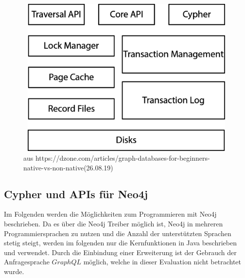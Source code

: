 \begin{figure}[H]
	\centering
	\includegraphics [width=12cm, height=8cm]{Figures/architecture}
	\caption[Architekur von Neo4j]{ aus https://dzone.com/articles/graph-databases-for-beginners-native-vs-non-native(26.08.19)}
	\label{fig:Architecure}
\end{figure}

\subsection{Cypher und APIs für Neo4j}
Im Folgenden werden die Möglichkeiten zum Programmieren mit Neo4j beschrieben. Da es über die Neo4j Treiber möglich ist, Neo4j in mehreren Programmiersprachen zu nutzen und die Anzahl der unterstützten Sprachen stetig steigt, werden im folgenden nur die Kernfunktionen in Java beschrieben und verwendet. Durch die Einbindung einer Erweiterung  ist der Gebrauch der Anfragesprache $GraphQL$ möglich, welche in dieser Evaluation nicht betrachtet wurde.

